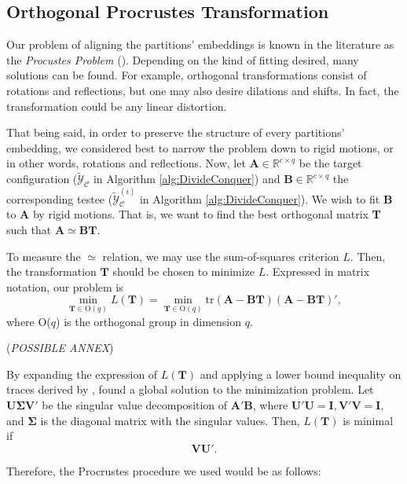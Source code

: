 \subsection{Orthogonal Procrustes Transformation}
\label{sec:Procrustes}

Our problem of aligning the partitions' embeddings is known in the literature as the \textit{Procustes Problem} (\cite{Borg2005}). Depending on the kind of fitting desired, many solutions can be found. For example, orthogonal transformations consist of rotations and reflections, but one may also desire dilations and shifts. In fact, the transformation could be any linear distortion.

That being said, in order to preserve the structure of every partitions' embedding, we considered best to narrow the problem down to rigid motions, or in other words, rotations and reflections. Now, let $\mathbf{A} \in \mathbb{R}^{c \times q}$ be the target configuration ($\tilde{\mathcal{Y}}_{\mathcal{C}}$ in Algorithm \ref{alg:DivideConquer}) and $\mathbf{B} \in \mathbb{R}^{c \times q}$ the corresponding testee ($\tilde{\mathcal{Y}}_{\mathcal{C}}^{(i)}$ in Algorithm \ref{alg:DivideConquer}). We wish to fit \textbf{B} to \textbf{A} by rigid motions. That is, we want to find the best orthogonal matrix \textbf{T} such that $\mathbf{A} \simeq \mathbf{BT}$.

To measure the $\simeq$ relation, we may use the sum-of-squares criterion $L$. Then, the transformation $\mathbf{T}$ should be chosen to minimize $L$. Expressed in matrix notation, our problem is
$$
\min_{\mathbf{T} \in \text{O}(q)} L(\mathbf{T}) = \min_{\mathbf{T} \in \text{O}(q)} \text{tr}(\mathbf{A}-\mathbf{BT})(\mathbf{A}-\mathbf{BT})',
$$
where O($q$) is the orthogonal group in dimension $q$.

(\textit{POSSIBLE ANNEX})

By expanding the expression of $L(\mathbf{T})$ and applying a lower bound inequality on traces derived by \cite{Kristof1970}, \cite{Borg2005} found a global solution to the minimization problem. Let $\mathbf{U}\boldsymbol{\Sigma}\mathbf{V}'$ be the singular value decomposition of $\mathbf{A}' \mathbf{B}$, where $\mathbf{U}' \mathbf{U}=\mathbf{I}, \mathbf{V}' \mathbf{V}=\mathbf{I}$, and $\boldsymbol{\Sigma}$ is the diagonal matrix with the singular values. Then, $L(\mathbf{T})$ is minimal if
$$
\mathbf{V} \mathbf{U}'.
$$

Therefore, the Procrustes procedure we used would be as follows:

